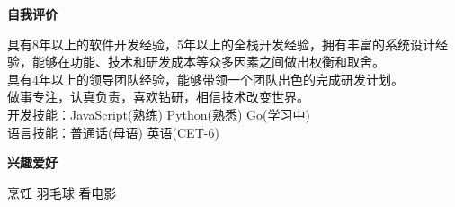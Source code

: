\documentclass[a4paper]{article}
\newenvironment{changemargin}[2]{%
  \begin{list}{}{%
    \setlength{\topsep}{0pt}%
    \setlength{\leftmargin}{#1}%
    \setlength{\rightmargin}{#2}%
    \setlength{\listparindent}{\parindent}%
    \setlength{\itemindent}{\parindent}%
    \setlength{\parsep}{\parskip}%
  }%
  \item[]}{\end{list}
}
\newcommand{\lineover}{
	\begin{changemargin}{-0.05in}{-0.05in}
		\vspace*{-8pt}
		\hrulefill \\
		\vspace*{-2pt}
	\end{changemargin}
}
\newcommand{\header}[1]{
	\begin{changemargin}{-0.5in}{-0.5in}
	\fontsize{12}{14} \scshape{\textbf{#1}}\\
	\end{changemargin}
}
\newenvironment{body} {
	\vspace*{-16pt}
	\begin{changemargin}{-0.5in}{-0.5in}
  }	
	{\end{changemargin}
}
\begin{document}



\header{自我评价}

\begin{body}
	\vspace{14pt}
	具有8年以上的软件开发经验，5年以上的全栈开发经验，拥有丰富的系统设计经验，能够在功能、技术和研发成本等众多因素之间做出权衡和取舍。\\
	具有4年以上的领导团队经验，能够带领一个团队出色的完成研发计划。\\
	做事专注，认真负责，喜欢钻研，相信技术改变世界。\\
	开发技能：{\fontarial JavaScript}(熟练) {\fontarial Python}(熟悉) Go(学习中)\\
	语言技能：普通话(母语) 英语({\fontarial CET-6})\\
\end{body}

\medskip





\header{兴趣爱好}

\begin{body}
	\vspace{14pt}
	烹饪 羽毛球 看电影\\
\end{body}
\end{document}
